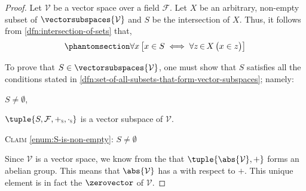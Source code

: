 \begin{proof}
    Let \( \mathcal{V} \) be a vector space over a field \( \mathcal{F} \).
    Let \( X \) be an arbitrary, non-empty subset of \( \vectorsubspaces{\mathcal{V}} \) and
    \( S \) be the intersection of \( X \). Thus, it follows from \cref{dfn:intersection-of-sets} that,
    \begin{equation}
        \phantomsection \label{eq:S-is-the-intersection-of-X}
        \forall x \, \big[ x \in S \iff \forall z\,{\in}\,X \, \big( x \in z \big) \big]
    \end{equation}

    \vspace{0.3cm}
    \noindent
    To prove that \( S \in \vectorsubspaces{\mathcal{V}} \), one must show that \( S \) satisfies all the conditions stated in
    \cref{dfn:set-of-all-subsets-that-form-vector-subspaces}; namely:
    \begin{enumerate*}[label=(\roman*)]
        \item \( S \neq \emptyset \),  \label{enum:S-is-non-empty}
        \item \( \tuple{S, \mathcal{F}, \smallsubscript{+}{S}, \smallsubscript{\cdot}{S} } \) is a vector subspace of \( \mathcal{V} \).
             \label{enum:S-is-a-vector-subspace-of-V}
    \end{enumerate*}

    \vspace{0.3cm}
    \noindent
    {\scshape Claim} \ref{enum:S-is-non-empty}: \( S \neq \emptyset \)

    \vspace{0.1cm}
    \noindent
    Since \( \mathcal{V} \) is a vector space,
    we know from the  that \( \tuple{\abs{\mathcal{V}}, +} \)
    forms an abelian group. This means that \( \abs{\mathcal{V}} \) has a  with respect to \( + \).
    This unique element is in fact the  \( \zerovector \) of \( \mathcal{V} \).


\end{proof}
